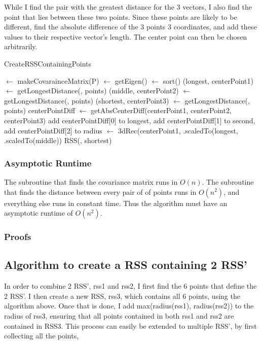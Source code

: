 While I find the pair with the greatest distance for the 3 vectors, I also find the point that lies between these two points. Since these points are likely to be different, find the absolute difference of the 3 points 3 coordinates, and add these values to their respective vector's length. The center point can then be chosen arbitrarily.

\begin{algorithm}[H]
  \caption{CreateRSSContainingPoints}
   
  \dontprintsemicolon
  \covar $\gets$ makeCovarainceMatrix(P)\;
  \eigen $\gets$ getEigen(\covar) \;
  \eigen $\gets$ sort(\eigen) \;
  (longest, centerPoint1) $\gets$ getLongestDistance(\eigen[2], points) \;
  (middle, centerPoint2) $\gets$ getLongestDistance(\eigen[1], points) \;
  (shortest, centerPoint3) $\gets$ getLongestDistance(\eigen[0], points) \;
  centerPointDiff $\gets$ getAbsCenterDiff(centerPoint1, centerPoint2, centerPoint3) \;
  add centerPointDiff[0] to longest, add centerPointDiff[1] to second, add centerPointDiff[2] to radius \;
  \threedeeRec $\gets$ 3dRec(centerPoint1, \eigen[2].scaledTo(longest, \eigen[1].scaledTo(middle)) \;
  \return RSS(\threedeeRec, shortest) \;
\end{algorithm}

\subsubsection{Asymptotic Runtime}
The subroutine that finds the covariance matrix runs in $O(n)$. The subroutine that finds the distance between every pair of of points runs in $O(n^2)$, and everything else runs in constant time. Thus the algorithm must have an asymptotic runtime of $O(n^2)$.

\subsubsection{Proofs}
\item[First algorithm:]

\subsection{Algorithm to create a RSS containing 2 RSS'}
In order to combine  2 RSS', rss1 and rss2, I first find the 6 points that define the 2 RSS'. I then create a new RSS, rss3, which contains all 6 points, using the algorithm above. Once that is done, I add  max(radius(rss1), radius(rss2)) to the radius of rss3, ensuring that all points contained in both rss1 and rss2 are contained in RSS3. This process can easily be extended to multiple RSS', by first collecting all the points, 

